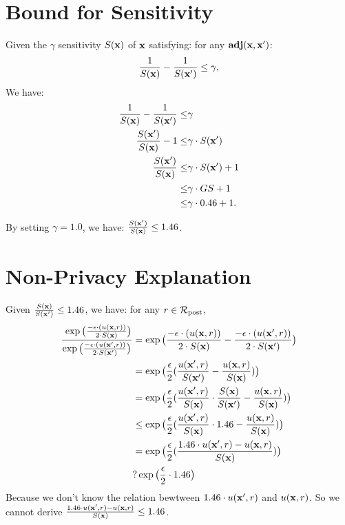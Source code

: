 \documentclass{article}
\begin{document}
\section{Bound for Sensitivity}
Given the $\gamma$ sensitivity $S(\textbf{x})$ of $\textbf{x}$ satisfying: for any $\textbf{adj}(\textbf{x},\textbf{x}')$:
\begin{equation}
\label{eq_gamma_smooth}
\frac{1}{S(\textbf{x})} - \frac{1}{S(\textbf{x}')} \leq \gamma,
\end{equation}
We have:
\begin{align*}
\frac{1}{S(\textbf{x})} - \frac{1}{S(\textbf{x}')} \leq & \gamma\\
\frac{S(\textbf{x}')}{S(\textbf{x})} - 1 \leq & \gamma \cdot S(\textbf{x}')\\
\frac{S(\textbf{x}')}{S(\textbf{x})} \leq & \gamma \cdot S(\textbf{x}') + 1\\
\leq & \gamma \cdot GS + 1 \\
\leq & \gamma \cdot 0.46 + 1.
\end{align*}

By setting $\gamma = 1.0$, we have: $\frac{S(\textbf{x}')}{S(\textbf{x})} \leq 1.46$.


\section{Non-Privacy Explanation}
Given $\frac{S(\textbf{x})}{S(\textbf{x}')} \leq 1.46$, we have: for any $r \in \mathcal{R}_{\textup{post}}$,
  \begin{equation*}
  \begin{split}
  \frac {\
  \exp\big(
  \frac{-\epsilon\cdot(u(\textbf{x}, {r}))}{2\cdot S(\textbf{x})}
  \big)}
  {\exp\big(
  \frac
  {-\epsilon\cdot(u(\textbf{x}', {r}))}{2\cdot S(\textbf{x}')}
  \big)}
  & = \exp\big(
  \frac{-\epsilon\cdot(u(\textbf{x}, {r}))}{2\cdot S(\textbf{x})}
  - 
  \frac{-\epsilon\cdot(u(\textbf{x}', {r}))}{2\cdot S(\textbf{x}')}
  \big)\\
  & = \exp
  \big(
  \frac{\epsilon}{2}
  (\frac{u(\textbf{x}', {r})}{S(\textbf{x}')}
  - 
  \frac{u(\textbf{x}, {r})}{ S(\textbf{x})})
  \big)\\
  & = \exp
  \big(
  \frac{\epsilon}{2}
  (\frac{u(\textbf{x}', {r})}{ S(\textbf{x})}\cdot \frac{S(\textbf{x})}{S(\textbf{x}')}
  - 
  \frac{u(\textbf{x}, {r})}{S(\textbf{x})} )
  \big)\\
  & \leq \exp
  \big(
  \frac{\epsilon}{2}
  (\frac{u(\textbf{x}', {r})}{ S(\textbf{x})}\cdot 1.46
  - 
  \frac{u(\textbf{x}, {r})}{S(\textbf{x})})
  \big)\\
  & = \exp
  \big(
  \frac{\epsilon}{2}
  (\frac{1.46 \cdot u(\textbf{x}', {r}) - u(\textbf{x}, {r})}{S(\textbf{x})})
  \big)\\
  & ? \exp
  \big(
  \frac{\epsilon}{2} \cdot 1.46
  \big)
  \end{split}
  \end{equation*}
  Because we don't know the relation bewtween $1.46 \cdot u(\textbf{x}', {r})$ and $u(\textbf{x}, {r})$. So we cannot derive $\frac{1.46 \cdot u(\textbf{x}', {r}) - u(\textbf{x}, {r})}{S(\textbf{x})} \leq 1.46$.
\end{document}
